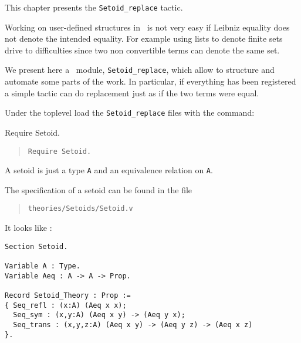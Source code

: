 \label{Setoid_replace}

This chapter presents  the \texttt{Setoid\_replace} tactic.


Working on user-defined structures in \Coq\ is not very easy if
Leibniz equality does not denote the intended equality. For example
using lists to denote finite sets drive to difficulties since two
non convertible terms can denote the same set.

We present here a \Coq\ module, {\tt Setoid\_replace}, which allow to
structure and automate some parts of the work. In particular, if
everything has been registered a simple
tactic can do replacement just as if the two terms were equal.


Under the toplevel
load the \texttt{Setoid\_replace} files with the command:

\begin{coq_eval}
  Require Setoid.
\end{coq_eval}

\begin{quotation}
\begin{verbatim}
Require Setoid.
\end{verbatim}
\end{quotation}

A setoid is just a type \verb+A+ and an equivalence relation on \verb+A+.

The specification of a setoid can be found in the file

\begin{quotation}
\begin{verbatim}
theories/Setoids/Setoid.v
\end{verbatim}
\end{quotation}

It looks like :
\begin{small}
\begin{flushleft}
\begin{verbatim}
Section Setoid.

Variable A : Type.
Variable Aeq : A -> A -> Prop.

Record Setoid_Theory : Prop :=
{ Seq_refl : (x:A) (Aeq x x);
  Seq_sym : (x,y:A) (Aeq x y) -> (Aeq y x);
  Seq_trans : (x,y,z:A) (Aeq x y) -> (Aeq y z) -> (Aeq x z)
}.
\end{verbatim}
\end{flushleft}
\end{small}


